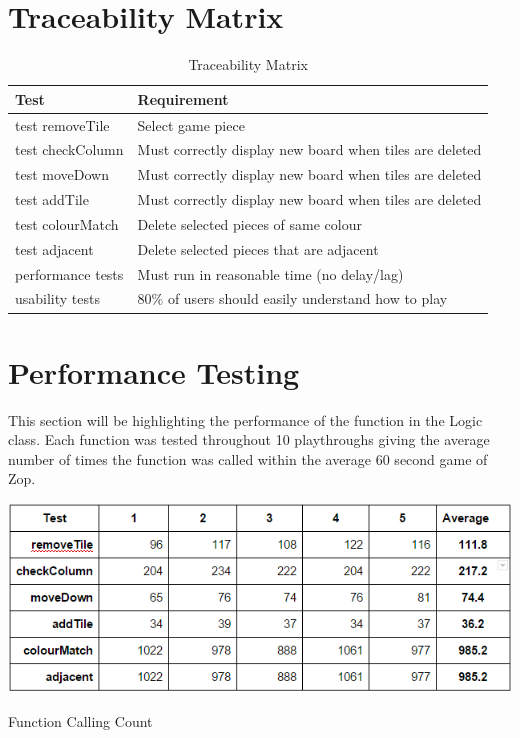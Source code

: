 \documentclass[12pt]{article}
\begin{document}
\section{Traceability Matrix}
\begin{table}[H]
\centering
\begin{tabular}{p{} p{}}
\toprule
\textbf{Test} & \textbf{Requirement}\\
\midrule
test removeTile & Select game piece\\
test checkColumn & Must correctly display new board when tiles are deleted\\
test moveDown & Must correctly display new board when tiles are deleted\\
test addTile & Must correctly display new board when tiles are deleted\\
test colourMatch & Delete selected pieces of same colour\\
test adjacent & Delete selected pieces that are adjacent\\
performance tests & Must run in reasonable time (no delay/lag)\\
usability tests & 80\% of users should easily understand how to play\\

\bottomrule
\end{tabular}
\caption{Traceability Matrix}
\end{table}


\section{Performance Testing}
This section will be highlighting the performance of the function in the Logic class.  Each function was tested throughout 10 playthroughs giving the average number of times the function was called within the average 60 second game of Zop.
\begin{table}[h!]
\includegraphics[width = 17cm]{perfTable}
\caption{Function Calling Count}
\end{table}
					
\end{document}
